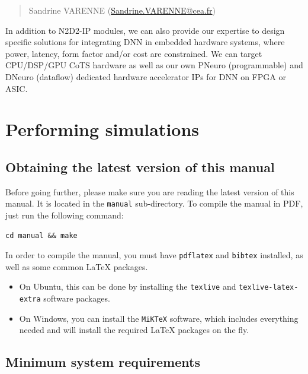 \documentclass[a4paper,11pt,oneside]{article}
\newenvironment{myitemize}
{ \begin{itemize}
    \setlength{\itemsep}{0pt}
    \setlength{\parskip}{0pt}
    \setlength{\parsep}{0pt}     }
{ \end{itemize}                  }
\begin{document}
\begin{quote}
Sandrine VARENNE (\href{mailto:Sandrine.VARENNE@cea.fr?subject=[N2D2-IP inquiry]&body=I am interested in obtaining [...] N2D2-IP module(s).\%0A\%0A[please describe briefly the intended usage].\%0A\%0A[your affiliation and contact information].}{Sandrine.VARENNE@cea.fr})
\end{quote}

In addition to N2D2-IP modules, we can also provide our expertise to design specific solutions for integrating DNN in embedded hardware systems, where power, latency, form factor and/or cost are constrained. We can target CPU/DSP/GPU CoTS hardware as well as our own PNeuro (programmable) and DNeuro (dataflow) dedicated hardware accelerator IPs for DNN on FPGA or ASIC.

\section{Performing simulations}

\subsection{Obtaining the latest version of this manual}

Before going further, please make sure you are reading the latest version of
 this manual.
It is located in the {\tt{}manual} sub-directory. To compile the manual
in PDF, just run
the following command:
\begin{lstlisting}
cd manual && make
\end{lstlisting}

In order to compile the manual, you must have \lstinline!pdflatex! and \lstinline!bibtex! installed, as well as some common LaTeX packages.

\begin{myitemize}
    \item On Ubuntu, this can be done by installing the \lstinline!texlive! and \lstinline!texlive-latex-extra! software packages.
    \item On Windows, you can install the \lstinline!MiKTeX! software, which includes everything needed and will install the required LaTeX packages on the fly.
\end{myitemize}


\subsection{Minimum system requirements}
\end{document}
